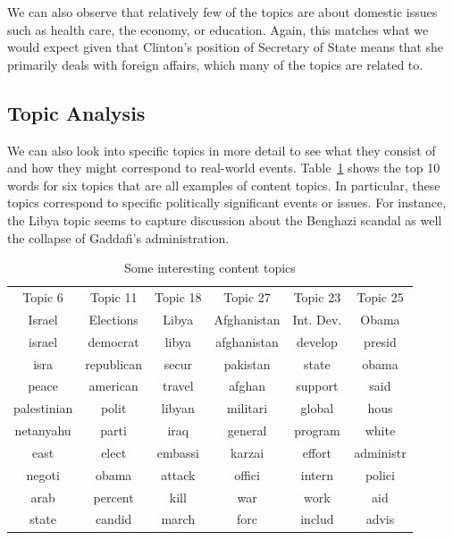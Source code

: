 \documentclass[12pt]{article}
\theoremstyle{definition}
\theoremstyle{algodesc}
\begin{document}
We can also observe that relatively few of the topics are about domestic issues such as health care, the economy, or education. Again, this matches what we would expect given that Clinton's position of Secretary of State means that she primarily deals with foreign affairs, which many of the topics are related to.



\subsection{Topic Analysis}
We can also look into specific topics in more detail to see what they consist of and how they might correspond to real-world events. Table~\ref{tab:content_topics} shows the top 10 words for six topics that are all examples of content topics. In particular, these topics correspond to specific politically significant events or issues. For instance, the Libya topic seems to capture discussion about the Benghazi scandal as well the collapse of Gaddafi's administration.

\begin{table}[h] \centering
\begin{tabular}{cccccc}
  \toprule
  Topic 6 & Topic 11 & Topic 18 & Topic 27 & Topic 23 & Topic 25 \\
  Israel & Elections & Libya & Afghanistan & Int. Dev. & Obama \\
  \midrule
  israel & democrat & libya & afghanistan & develop & presid \\
  isra & republican & secur & pakistan & state & obama \\
  peace & american & travel & afghan & support & said \\
  palestinian & polit & libyan & militari & global & hous \\
  netanyahu & parti & iraq & general & program & white \\
  east & elect & embassi & karzai & effort & administr \\
  negoti & obama & attack & offici & intern & polici \\
  arab & percent & kill & war & work & aid \\
  state & candid & march & forc & includ & advis \\
  \bottomrule
\end{tabular}
\caption{Some interesting content topics}
\label{tab:content_topics}
\end{table}
\end{document}
